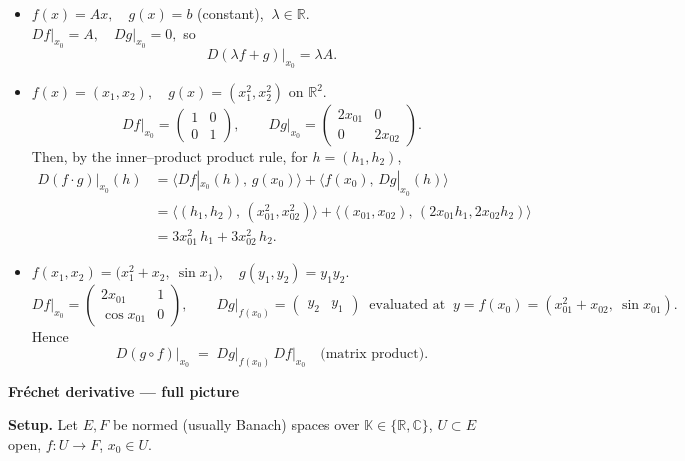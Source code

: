 \documentclass[12pt,a4paper]{article}
\theoremstyle{plain}
\theoremstyle{definition}
\theoremstyle{remark}
\theoremstyle{remark}
\newcommand{\probheader}[1]{%
	\par\vspace{8pt}%
	{\Large\bfseries #1\par}%
	\vspace{6pt}%
}
\begin{document}
	\begin{itemize}
		
		\item[(a)] $f(x)=Ax,\quad g(x)=b$ (constant), $\ \lambda\in\mathbb{R}$.\\
		$Df\big|_{x_0}=A,\quad Dg\big|_{x_0}=0,$ so
		\[
		D(\lambda f+g)\big|_{x_0}=\lambda A.
		\]
		
		\item[(b)] $f(x)=(x_1,x_2),\quad g(x)=(x_1^2,x_2^2)$ on $\mathbb{R}^2$.\\
		\[
		Df\big|_{x_0}=\begin{pmatrix}1&0\\[2pt]0&1\end{pmatrix},
		\qquad
		Dg\big|_{x_0}=\begin{pmatrix}2x_{01}&0\\[2pt]0&2x_{02}\end{pmatrix}.
		\]
		Then, by the inner–product product rule, for $h=(h_1,h_2)$,
		\[
		\begin{aligned}
			D(f\cdot g)\big|_{x_0}(h)
			&= \langle Df|_{x_0}(h),\, g(x_0)\rangle + \langle f(x_0),\, Dg|_{x_0}(h)\rangle \\[2pt]
			&= \langle (h_1,h_2),\, (x_{01}^2,x_{02}^2)\rangle
			+ \langle (x_{01},x_{02}),\, (2x_{01}h_1,2x_{02}h_2)\rangle \\[2pt]
			&= 3x_{01}^2\,h_1 + 3x_{02}^2\,h_2.
		\end{aligned}
		\]
		
		\item[(c)] $f(x_1,x_2)=\big(x_1^2+x_2,\ \sin x_1\big),\quad g(y_1,y_2)=y_1y_2$.\\
		\[
		Df\big|_{x_0}=
		\begin{pmatrix}
			2x_{01} & 1\\[2pt]
			\cos x_{01} & 0
		\end{pmatrix},
		\qquad
		Dg\big|_{f(x_0)}=\begin{pmatrix} y_2 & y_1 \end{pmatrix}
		\ \text{ evaluated at }\ y=f(x_0)=(x_{01}^2+x_{02},\ \sin x_{01}).
		\]
		Hence
		\[
		D(g\circ f)\big|_{x_0} \;=\; Dg\big|_{f(x_0)}\,Df\big|_{x_0} \quad \text{(matrix product).}
		\]
		
	\end{itemize}
	
	\probheader{Fr\'echet derivative — full picture}
	
	\textbf{Setup.}
	Let $E,F$ be normed (usually Banach) spaces over $\mathbb{K}\in\{\mathbb{R},\mathbb{C}\}$,
	$U\subset E$ open, $f:U\to F$, $x_0\in U$.
	
\end{document}
